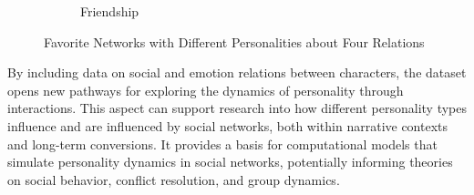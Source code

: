 \begin{figure}[!h]
\begin{subfigure}[b]{0.22\textwidth}
        \caption{Friendship}
        \label{fig:subgraph4}
    \end{subfigure}
    \caption{Favorite Networks with Different Personalities about Four Relations}
    \label{fig:networks}
\end{figure}

By including data on social and emotion relations between characters, the dataset opens new pathways for exploring the dynamics of personality through interactions. This aspect can support research into how different personality types influence and are influenced by social networks, both within narrative contexts and long-term conversions. It provides a basis for computational models that simulate personality dynamics in social networks, potentially informing theories on social behavior, conflict resolution, and group dynamics.
